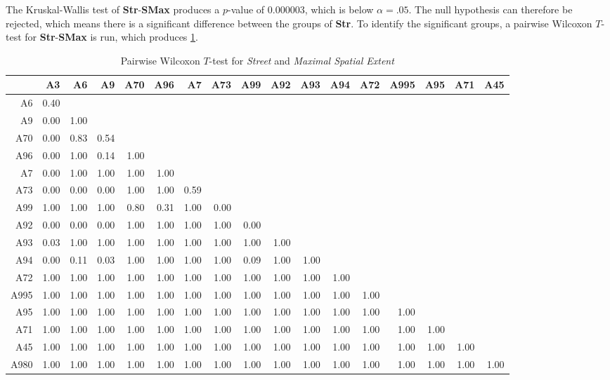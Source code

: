 The Kruskal-Wallis test of \textbf{Str}-\textbf{SMax} produces a $p$-value of 0.000003, which is below $\alpha=.05$. The null hypothesis can therefore be rejected, which means there is a significant difference between the groups of \textbf{Str}. To identify the significant groups, a pairwise Wilcoxon $T$-test for \textbf{Str}-\textbf{SMax} is run, which produces \cref{tbl:wilcoxon_baysis_matched_Str_SMax}.
\begin{table}[ht!]
	\tiny
	\setlength{\tabcolsep}{4pt}
	\centering
	\begin{tabular}{rrrrrrrrrrrrrrrrr}
		\toprule
				& A3   & A6   & A9   & A70  & A96  & A7   & A73   & A99 & A92 & A93 & A94 & A72 & A995 & A95 & A71 & A45 \\ 
		\midrule
		A6 		& 0.40 &  &  &  &  &  &  &  &  &  &  &  &  &  &  &  \\ 
		A9 		& 0.00 & 1.00 &  &  &  &  &  &  &  &  &  &  &  &  &  &  \\ 
		A70 	& 0.00 & 0.83 & 0.54 &  &  &  &  &  &  &  &  &  &  &  &  &  \\ 
		A96 	& 0.00 & 1.00 & 0.14 & 1.00 &  &  &  &  &  &  &  &  &  &  &  &  \\ 
		A7 		& 0.00 & 1.00 & 1.00 & 1.00 & 1.00 &  &  &  &  &  &  &  &  &  &  &  \\ 
		A73 	& 0.00 & 0.00 & 0.00 & 1.00 & 1.00 & 0.59 &  &  &  &  &  &  &  &  &  &  \\ 
		A99 	& 1.00 & 1.00 & 1.00 & 0.80 & 0.31 & 1.00 & 0.00 &  &  &  &  &  &  &  &  &  \\ 
		A92 	& 0.00 & 0.00 & 0.00 & 1.00 & 1.00 & 1.00 & 1.00 & 0.00 &  &  &  &  &  &  &  &  \\ 
		A93 	& 0.03 & 1.00 & 1.00 & 1.00 & 1.00 & 1.00 & 1.00 & 1.00 & 1.00 &  &  &  &  &  &  &  \\ 
		A94 	& 0.00 & 0.11 & 0.03 & 1.00 & 1.00 & 1.00 & 1.00 & 0.09 & 1.00 & 1.00 &  &  &  &  &  &  \\ 
		A72 	& 1.00 & 1.00 & 1.00 & 1.00 & 1.00 & 1.00 & 1.00 & 1.00 & 1.00 & 1.00 & 1.00 &  &  &  &  &  \\ 
		A995 	& 1.00 & 1.00 & 1.00 & 1.00 & 1.00 & 1.00 & 1.00 & 1.00 & 1.00 & 1.00 & 1.00 & 1.00 &  &  &  &  \\ 
		A95 	& 1.00 & 1.00 & 1.00 & 1.00 & 1.00 & 1.00 & 1.00 & 1.00 & 1.00 & 1.00 & 1.00 & 1.00 & 1.00 &  &  &  \\ 
		A71 	& 1.00 & 1.00 & 1.00 & 1.00 & 1.00 & 1.00 & 1.00 & 1.00 & 1.00 & 1.00 & 1.00 & 1.00 & 1.00 & 1.00 &  &  \\ 
		A45 	& 1.00 & 1.00 & 1.00 & 1.00 & 1.00 & 1.00 & 1.00 & 1.00 & 1.00 & 1.00 & 1.00 & 1.00 & 1.00 & 1.00 & 1.00 &  \\ 
		A980 	& 1.00 & 1.00 & 1.00 & 1.00 & 1.00 & 1.00 & 1.00 & 1.00 & 1.00 & 1.00 & 1.00 & 1.00 & 1.00 & 1.00 & 1.00 & 1.00 \\ 
		\bottomrule
	\end{tabular}
	\caption{Pairwise Wilcoxon $T$-test for \textit{Street} and \textit{Maximal Spatial Extent}}
	\label{tbl:wilcoxon_baysis_matched_Str_SMax}
\end{table}
